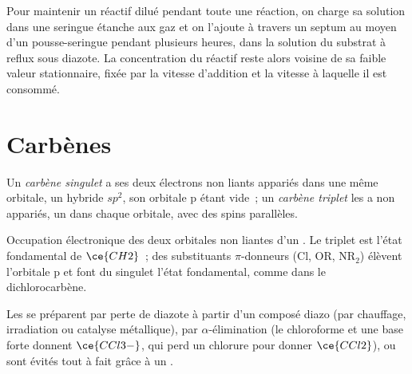 \begin{inthelab}
Pour maintenir un réactif dilué pendant toute une réaction, on charge sa
solution dans une seringue étanche aux gaz et on l'ajoute à travers un
septum au moyen d'un pousse-seringue pendant plusieurs heures, dans la
solution du substrat à reflux sous diazote. La concentration du réactif
reste alors voisine de sa faible valeur stationnaire, fixée par la vitesse
d'addition et la vitesse à laquelle il est consommé.
\end{inthelab}

\section{Carbènes}

\begin{definition}\label{def:b3:radicals-carbenes:carbene-states}
Un \emph{carbène singulet} a ses deux électrons non
liants appariés dans une même orbitale, un hybride $sp^2$, son orbitale p étant vide~; un
\emph{carbène triplet} les a non appariés, un dans
chaque orbitale, avec des spins parallèles.
\end{definition}

\begin{omfigure}

{\small Occupation électronique des deux orbitales non liantes d'un .
Le triplet est l'état fondamental de $\ce{CH2}$~; des substituants $\pi$-donneurs (Cl, OR, $\mathrm{NR_2}$) élèvent l'orbitale
p et font du singulet l'état fondamental, comme dans le dichlorocarbène.}
\end{omfigure}

Les  se préparent par perte de diazote à partir d'un composé diazo
(par chauffage, irradiation ou catalyse métallique), par $\alpha$-élimination (le chloroforme et une base forte donnent
$\ce{CCl3-}$, qui perd un chlorure pour donner $\ce{CCl2}$), ou sont évités tout à fait grâce à un
.

